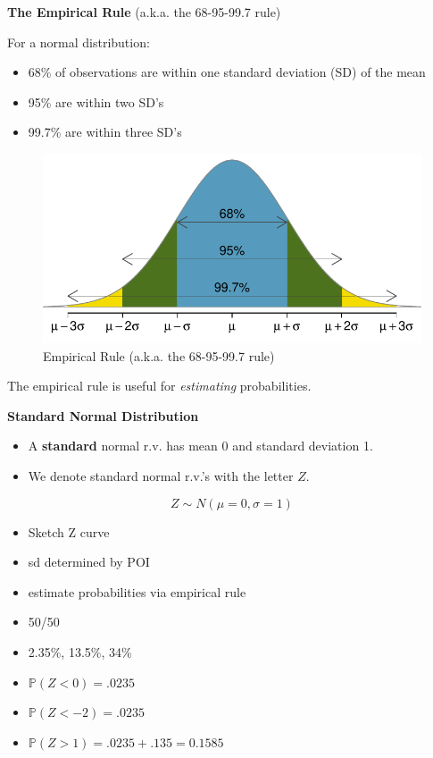 \documentclass[12pt]{amsart}
\newcommand{\m}{\mu}
\newcommand{\s}{\sigma}
\newcommand{\bP}{\mathbb{P}}
\begin{document}
{\newpage

\textbf{The Empirical Rule} (a.k.a. the 68-95-99.7 rule) \newline

For a normal distribution: 
\begin{itemize}
\item 68\% of observations are within one standard deviation (SD) of the mean
\item 95\% are within two SD’s
\item 99.7\% are within three SD’s
\end{itemize}


\begin{figure}[h!]
  \includegraphics[width=5in]{img/6895997.pdf}
  \caption{Empirical Rule (a.k.a. the 68-95-99.7 rule)}
  \label{fig:normal}
\end{figure}


The empirical rule is useful for \textit{estimating} probabilities.

\vspace{1cm}

\textbf{Standard Normal Distribution} \newline

\begin{itemize}
\item A \textbf{standard} normal r.v. has mean 0 and standard deviation 1.
\item We denote standard normal r.v.'s with the letter $Z$.
\end{itemize}

\color{blue}
$$Z\sim N(\m=0,\s=1)$$

\begin{itemize}
\item Sketch Z curve
\item sd determined by POI
\item estimate probabilities via empirical rule
\item 50/50
\item 2.35\%, 13.5\%, 34\%
\item $\bP(Z<0) = .0235 $
\item $\bP(Z<-2) = .0235 $
\item $\bP(Z> 1) = .0235 + .135 = 0.1585$ 
\end{itemize}


}
\end{document}
